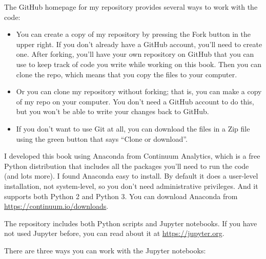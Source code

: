 \documentclass[12pt]{book}
\theoremstyle{exercise}
\begin{document}
The GitHub homepage for my repository provides several ways to
work with the code:

\begin{itemize}

\item You can create a copy of my repository by pressing the {\sf
  Fork} button in the upper right.  If you don't already have a GitHub
  account, you'll need to create one.  After forking, you'll have your
  own repository on GitHub that you can use to keep track of code you
  write while working on this book.  Then you can clone the repo,
  which means that you copy the files to your computer.


\item Or you can clone my repository without forking; that is, you can
  make a copy of my repo on your computer.  You don't need a GitHub
  account to do this, but you won't be able to write your changes back
  to GitHub.


\item If you don't want to use Git at all, you can download the files
  in a Zip file using the green button that says ``Clone or download''.

\end{itemize}

I developed this book using Anaconda from Continuum Analytics, which
is a free Python distribution that includes all the packages you'll
need to run the code (and lots more).  I found Anaconda easy to
install.  By default it does a user-level installation, not
system-level, so you don't need administrative privileges.  And it
supports both Python 2 and Python 3.  You can download Anaconda from
\url{https://continuum.io/downloads}.


The repository includes both Python scripts and Jupyter
notebooks.  If you have not used Jupyter before, you can read about
it at \url{https://jupyter.org}.


There are three ways you can work with the Jupyter notebooks:
\end{document}

